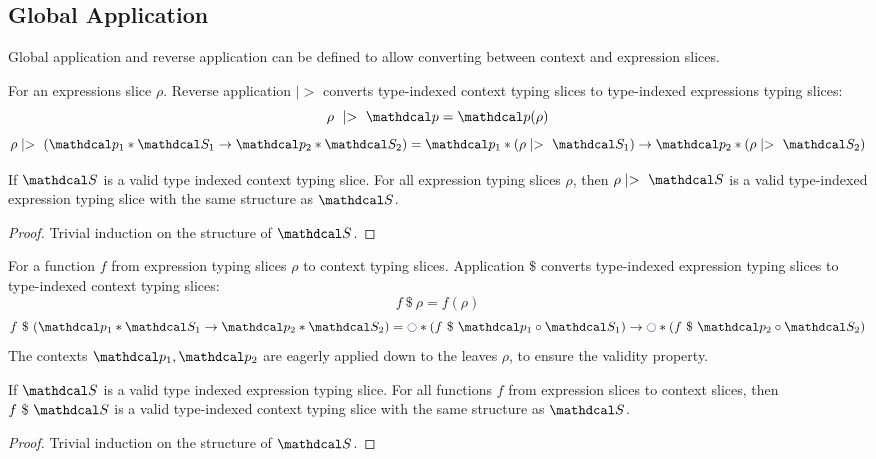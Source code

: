 \subsection{Global Application}
\label{sec:GlobalApplication}
Global application and reverse application can be defined to allow converting between context and expression slices.
\begin{definition}
For an expressions slice $\rho$. Reverse application $\mid>$ converts type-indexed context typing slices to type-indexed expressions typing slices:
\[\rho\ \mid>\ \p = \p(\rho)\]
\[\rho\mid>\ (\p_1 * \S_1 \to \p_2 * \S_2) = \p_1 * (\rho \mid>\ \S_1) \to \p_2 * (\rho\mid>\ \S_2)\]
\end{definition}
\begin{proposition}[Validity]
If $\S$ is a valid type indexed context typing slice. For all expression typing slices $\rho$, then $\rho \mid>\ \S$ is a valid type-indexed expression typing slice with the same structure as $\S$.
\end{proposition}
\begin{proof}
Trivial induction on the structure of $\S$.
\end{proof}
\label{def:Application}
\begin{definition}[Application]
For a function $f$ from expression typing slices $\rho$ to context typing slices. Application $\$$ converts type-indexed expression typing slices to type-indexed context typing slices:
\[f\ \$\ \rho = f(\rho)\]
\[f\ \$\ (\p_1 * \S_1 \to \p_2 * \S_2) = \cmark * (f\ \$\ \p_1 \circ \S_1) \to \cmark * (f\ \$\ \p_2 \circ \S_2)\]
The contexts $\p_1, \p_2$ are eagerly applied down to the leaves $\rho$, to ensure the validity property.
\end{definition}
\begin{proposition}[Validity]
If $\S$ is a valid type indexed expression typing slice. For all functions $f$ from expression slices to context slices, then $f\ \$\ \S$ is a valid type-indexed context typing slice with the same structure as $\S$.
\end{proposition}
\begin{proof}
Trivial induction on the structure of $\S$.
\end{proof}

